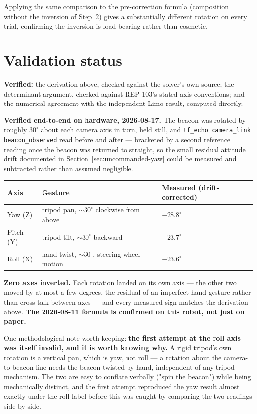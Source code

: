 \documentclass[11pt]{report}
\begin{document}
Applying the same comparison to the pre-correction formula (composition
without the inversion of Step~2) gives a substantially different rotation on
every trial, confirming the inversion is load-bearing rather than cosmetic.

\section{Validation status}

\textbf{Verified:} the derivation above, checked against the solver's own
source; the determinant argument, checked against REP-103's stated axis
conventions; and the numerical agreement with the independent Limo result,
computed directly.

\textbf{Verified end-to-end on hardware, 2026-08-17.} The beacon was rotated
by roughly $30^\circ$ about each camera axis in turn, held still, and
\texttt{tf\_echo camera\_link beacon\_observed} read before and after ---
bracketed by a second reference reading once the beacon was returned to
straight, so the small residual attitude drift documented in
Section~\ref{sec:uncommanded-yaw} could be measured and subtracted rather
than assumed negligible.

\begin{center}
\begin{tabular}{lll}
\toprule
Axis & Gesture & Measured (drift-corrected) \\
\midrule
Yaw (Z)   & tripod pan, $\sim30^\circ$ clockwise from above & $-28.8^\circ$ \\
Pitch (Y) & tripod tilt, $\sim30^\circ$ backward             & $-23.7^\circ$ \\
Roll (X)  & hand twist, $\sim30^\circ$, steering-wheel motion & $-23.6^\circ$ \\
\bottomrule
\end{tabular}
\end{center}

\textbf{Zero axes inverted.} Each rotation landed on its own axis --- the
other two moved by at most a few degrees, the residual of an imperfect hand
gesture rather than cross-talk between axes --- and every measured sign
matches the derivation above. \textbf{The 2026-08-11 formula is confirmed on
this robot, not just on paper.}

One methodological note worth keeping: \textbf{the first attempt at the roll
axis was itself invalid, and it is worth knowing why.} A rigid tripod's own
rotation is a vertical pan, which is yaw, not roll --- a rotation about the
camera-to-beacon line needs the beacon twisted by hand, independent of any
tripod mechanism. The two are easy to conflate verbally ("spin the beacon")
while being mechanically distinct, and the first attempt reproduced the yaw
result almost exactly under the roll label before this was caught by
comparing the two readings side by side.
\end{document}
